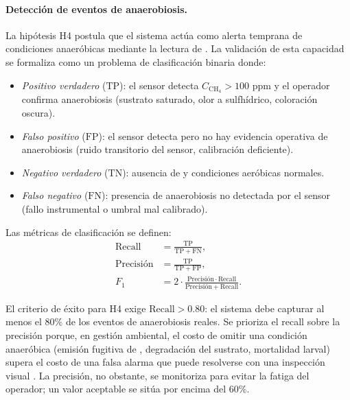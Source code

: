 \paragraph{Detección de eventos de anaerobiosis.}
La hipótesis H4 postula que el sistema actúa como alerta temprana de condiciones anaeróbicas mediante la lectura de . La validación de esta capacidad se formaliza como un problema de clasificación binaria donde:
\begin{itemize}
    \item \emph{Positivo verdadero} ($\mathrm{TP}$): el sensor detecta $C_{\mathrm{CH_4}} > \num{100}$ ppm y el operador confirma anaerobiosis (sustrato saturado, olor a sulfhídrico, coloración oscura).
    \item \emph{Falso positivo} ($\mathrm{FP}$): el sensor detecta  pero no hay evidencia operativa de anaerobiosis (ruido transitorio del sensor, calibración deficiente).
    \item \emph{Negativo verdadero} ($\mathrm{TN}$): ausencia de  y condiciones aeróbicas normales.
    \item \emph{Falso negativo} ($\mathrm{FN}$): presencia de anaerobiosis no detectada por el sensor (fallo instrumental o umbral mal calibrado).
\end{itemize}

Las métricas de clasificación se definen:
\begin{align}
    \label{eq:cap4_recall}
    \mathrm{Recall} &= \frac{\mathrm{TP}}{\mathrm{TP} + \mathrm{FN}}, \\
    \label{eq:cap4_precision}
    \mathrm{Precisión} &= \frac{\mathrm{TP}}{\mathrm{TP} + \mathrm{FP}}, \\
    \label{eq:cap4_f1}
    F_1 &= 2 \cdot \frac{\mathrm{Precisión} \cdot \mathrm{Recall}}
    {\mathrm{Precisión} + \mathrm{Recall}}.
\end{align}

El criterio de éxito para H4 exige $\mathrm{Recall} > \num{0.80}$: el sistema debe capturar al menos el \num{80}\% de los eventos de anaerobiosis reales. Se prioriza el recall sobre la precisión porque, en gestión ambiental, el costo de omitir una condición anaeróbica (emisión fugitiva de , degradación del sustrato, mortalidad larval) supera el costo de una falsa alarma que puede resolverse con una inspección visual \parencite{rossiEstimatingDynamicsGreenhouse2024}. La precisión, no obstante, se monitoriza para evitar la fatiga del operador; un valor aceptable se sitúa por encima del \num{60}\%.

